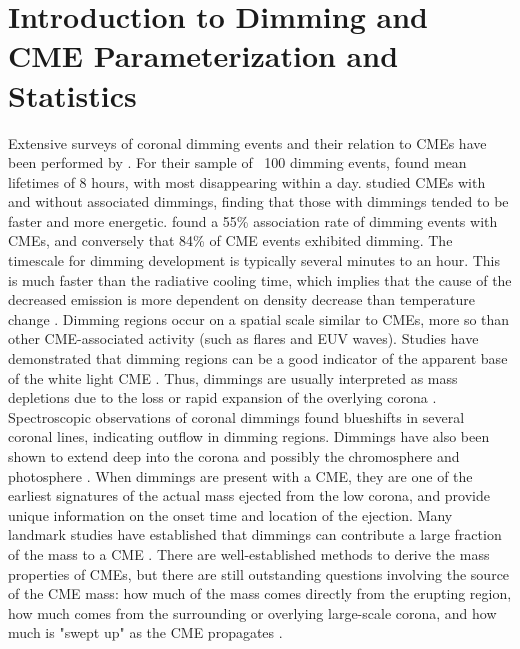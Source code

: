 \section{Introduction to Dimming and CME Parameterization and Statistics}
Extensive surveys of coronal dimming events and their relation to CMEs have been performed by \citet{Reinard2008, Reinard2009}. For their sample of ~100 dimming events, \citet{Reinard2008} found mean lifetimes of 8 hours, with most disappearing within a day. \citet{Reinard2009} studied CMEs with and without associated dimmings, finding that those with dimmings tended to be faster and more energetic. \citet{Bewsher2008} found a 55\% association rate of dimming events with CMEs, and conversely that 84\% of CME events exhibited dimming. The timescale for dimming development is typically several minutes to an hour. This is much faster than the radiative cooling time, which implies that the cause of the decreased emission is more dependent on density decrease than temperature change \citep{Hudson1996}. Dimming regions occur on a spatial scale similar to CMEs, more so than other CME-associated activity (such as flares and EUV waves). Studies have demonstrated that dimming regions can be a good indicator of the apparent base of the white light CME \citep{Thompson2000, Harrison2003, Zhukov2004}. Thus, dimmings are usually interpreted as mass depletions due to the loss or rapid expansion of the overlying corona \citep{Hudson1998, Harrison2000, Zhukov2004}. Spectroscopic observations of coronal dimmings \citep{Harra2001, Harrison2003, Harra2007} found blueshifts in several coronal lines, indicating outflow in dimming regions. Dimmings have also been shown to extend deep into the corona and possibly the chromosphere and photosphere \citep{McIntosh2007}. When dimmings are present with a CME, they are one of the earliest signatures of the actual mass ejected from the low corona, and provide unique information on the onset time and location of the ejection. Many landmark studies have established that dimmings can contribute a large fraction of the mass to a CME \citep{Harrison2000, Harrison2003, Zhukov2004, Aschwanden2009}. There are well-established methods to derive the mass properties of CMEs, but there are still outstanding questions involving the source of the CME mass: how much of the mass comes directly from the erupting region, how much comes from the surrounding or overlying large-scale corona, and how much is "swept up" as the CME propagates \citep{Bein2013}.

